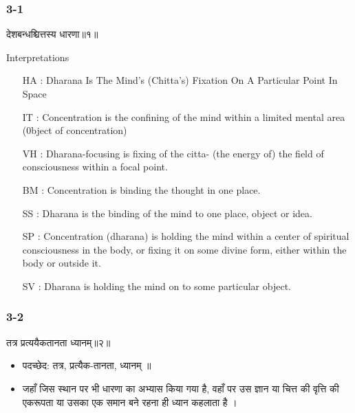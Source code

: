 \begin{frame}[fragile]\frametitle{3-1}
\begin{sanskrit}
देशबन्धश्चित्तस्य धारणा॥१॥
\end{sanskrit}

Interpretations
\begin{itemize}	
\item [HA]: Dharana Is The Mind’s (Chitta’s) Fixation On A Particular Point In Space
\item [IT]: Concentration is the confining of the mind within a limited mental area (0bject of concentration)
\item [VH]: Dharana-focusing is fixing of the citta- (the energy of) the field of consciousness within a focal point.
\item [BM]: Concentration is binding the thought in one place.
\item [SS]: Dharana is the binding of the mind to one place, object or idea.
\item [SP]: Concentration (dharana) is holding the mind within a center of spiritual consciousness in the body, or fixing it on some divine form, either within the body or outside it.
\item [SV]: Dharana is holding the mind on to some particular object. 
\end{itemize}
\end{frame}

\begin{frame}[fragile]\frametitle{3-2}
\begin{sanskrit}
तत्र प्रत्ययैकतानता ध्यानम्॥२॥
\end{sanskrit}

\begin{itemize}
\item पदच्छेद: तत्र, प्रत्यैक-तानता, ध्यानम् ॥
\item जहाँ जिस स्थान पर भी धारणा का अभ्यास किया गया है, वहाँ पर उस ज्ञान या चित्त की वृत्ति की एकरूपता या उसका एक समान बने रहना ही ध्यान कहलाता है ।
\end{itemize}
\end{frame}

